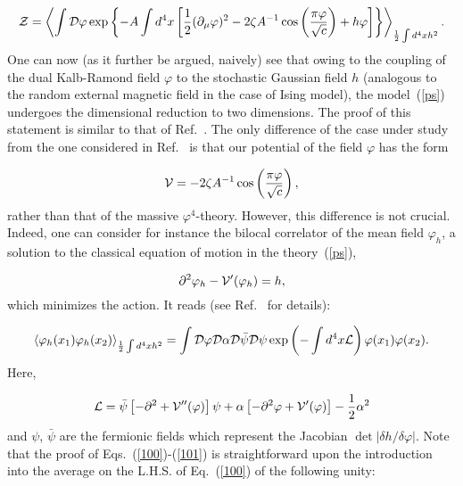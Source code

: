 \documentclass[a4paper,12pt]{article}
\begin{document}
\begin{equation}
\label{ps}
{\cal Z}=\left<\int {\cal D}\varphi\exp\left\{
-A\int d^4x\left[\frac12(\partial_\mu\varphi)^2-2\zeta A^{-1}\cos\left(\frac{\pi\varphi}{\sqrt{c}}\right)+
h\varphi\right]\right\}\right>_{\frac12\int d^4xh^2}.
\end{equation}
One can now (as it further be argued, naively) see that owing to the coupling of the dual Kalb-Ramond field $\varphi$ to the stochastic Gaussian 
field $h$ (analogous to the random external magnetic field in the case of Ising model), the model~(\ref{ps}) undergoes 
the dimensional reduction to two dimensions. The proof of this statement is similar to that of Ref.~\cite{ps}.
The only difference of the case under study from the one
considered in Ref.~\cite{ps} is that our potential of the field $\varphi$ has the form 

\begin{equation}
\label{poten}
{\cal V}=-2\zeta A^{-1}\cos\left(\frac{\pi\varphi}{\sqrt{c}}\right),
\end{equation} 
rather than that of the massive $\varphi^4$-theory. However, this 
difference is not crucial. Indeed, one can consider for instance the bilocal correlator of the mean field 
$\varphi_h$, a solution to the classical equation of motion in the theory~(\ref{ps}), 

\begin{equation}
\label{speq}
\partial^2\varphi_h-{\cal V}'(\varphi_h)=h,
\end{equation} 
which minimizes the action. It reads (see Ref.~\cite{ps} for details):

\begin{equation}
\label{100}
\left<\varphi_h(x_1)\varphi_h(x_2)\right>_{\frac12\int d^4xh^2}=
\int {\cal D}\varphi{\cal D}\alpha{\cal D}\bar\psi{\cal D}\psi\exp\left(-\int d^4x{\cal L}\right)
\varphi(x_1)\varphi(x_2).
\end{equation}
Here,

\begin{equation}
\label{101}
{\cal L}=\bar\psi\left[-\partial^2+{\cal V}''(\varphi)\right]\psi+\alpha\left[-\partial^2\varphi+{\cal V}'(\varphi)\right]
-\frac12\alpha^2
\end{equation}
and $\psi$, $\bar\psi$ are the fermionic fields which represent the Jacobian $\det|\delta h/\delta\varphi|$.
Note that the proof of Eqs.~(\ref{100})-(\ref{101}) is straightforward upon the introduction into the average on the L.H.S.
of Eq.~(\ref{100}) of the following unity:
\end{document}
